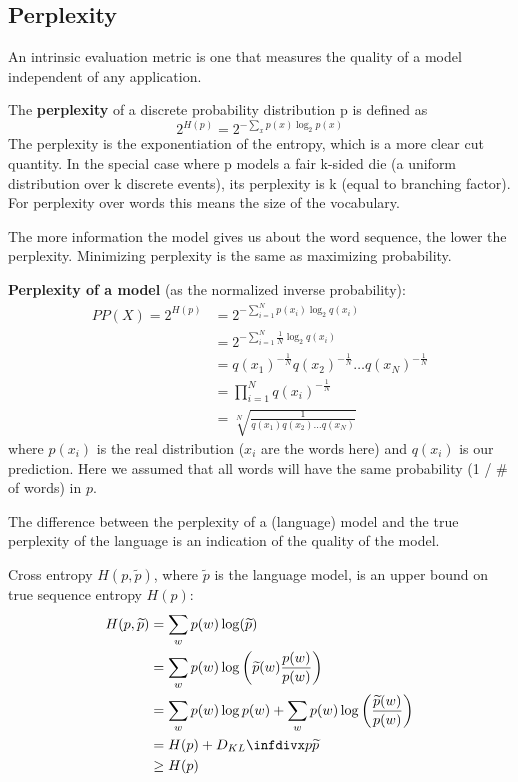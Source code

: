 \documentclass[12pt]{article}
\begin{document}
\subsection{Perplexity}
\par An intrinsic evaluation metric is one that measures the quality of a model independent of any application.
\par The \textbf{perplexity} of a discrete probability distribution p is defined as
\[ 2^{H(p)} = 2^{ -\sum_x p(x) \log_2 p(x) } \]
The perplexity is the exponentiation of the entropy, which is a more clear cut quantity. In the special case where p models a fair k-sided die (a uniform distribution over k discrete events), its perplexity is k (equal to branching factor). For perplexity over words this means the size of the vocabulary.
\par The more information the model gives us about the word sequence, the lower the perplexity. Minimizing perplexity is the same as maximizing probability.
\par \textbf{Perplexity of a model} (as the normalized inverse probability):
\begin{equation*}
\begin{split}
PP(X) = 2^{H(p)} &= 2^{ -\sum_{i=1}^N p(x_i) \log_2 q(x_i) } \\
&= 2^{ -\sum_{i=1}^N \frac{1}{N} \log_2 q(x_i) } \\
&= q(x_1)^{-\frac{1}{N}}q(x_2)^{-\frac{1}{N}}\dots q(x_N)^{-\frac{1}{N}} \\
&= \prod_{i=1}^N q(x_i)^{-\frac{1}{N}} \\
&= \sqrt[N]{\frac{1}{q(x_1)q(x_2)\dots q(x_N)}}
\end{split}
\end{equation*}
where $p(x_i)$ is the real distribution ($x_i$ are the words here) and $q(x_i)$ is our prediction. Here we assumed that all words will have the same probability (1 / \# of words) in $p$.
\par The difference between the perplexity of a (language) model and the true perplexity of the language is an indication of the quality of the model.
\par Cross entropy $H(p,\widetilde{p})$, where $\widetilde{p}$ is the language model, is an upper bound on true sequence entropy $H(p)$:
\begin{equation}
\begin{split}
H(p,\widetilde{p}) &= \sum_w p(w) \log(\widetilde{p}) \\
 &= \sum_w p(w) \log \left( \widetilde{p}(w) \frac{p(w)}{p(w)}\right) \\
 &= \sum_w p(w) \log p(w) + \sum_w p(w) \log \left( \frac{\widetilde{p}(w)}{p(w)}\right) \\
 &= H(p) + \dkl{p}{\widetilde{p}} \\
 &\geq H(p)
\end{split}
\end{equation}
\end{document}
